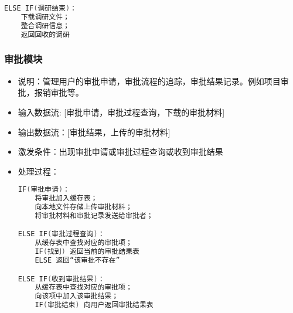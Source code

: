 {\begin{itemize}
\begin{lstlisting}[language=C, caption=错误信息处理单元, label={code:first-code}]
ELSE IF(调研结束)：
    下载调研文件；
    整合调研信息；
    返回回收的调研

\end{lstlisting}
        \end{itemize}
\subsubsection{\color{red} 审批模块}
        \begin{itemize}
            \item 说明：管理用户的审批申请，审批流程的追踪，审批结果记录。例如项目审批，报销审批等。
            \item 输入数据流: [审批申请，审批过程查询，下载的审批材料]
            \item 输出数据流：[审批结果，上传的审批材料]
            \item 激发条件：出现审批申请或审批过程查询或收到审批结果
            \item 处理过程：
\begin{lstlisting}[language=C, caption=错误信息处理单元, label={code:first-code}]
IF(审批申请)：
    将审批加入缓存表；
    向本地文件存储上传审批材料；
    将审批材料和审批记录发送给审批者；

ELSE IF(审批过程查询)：
    从缓存表中查找对应的审批项；
    IF(找到) 返回当前的审批结果表
    ELSE 返回“该审批不存在”

ELSE IF(收到审批结果)：
    从缓存表中查找对应的审批项；
    向该项中加入该审批结果；
    IF(审批结束) 向用户返回审批结果表
\end{lstlisting}
        \end{itemize}
        }
